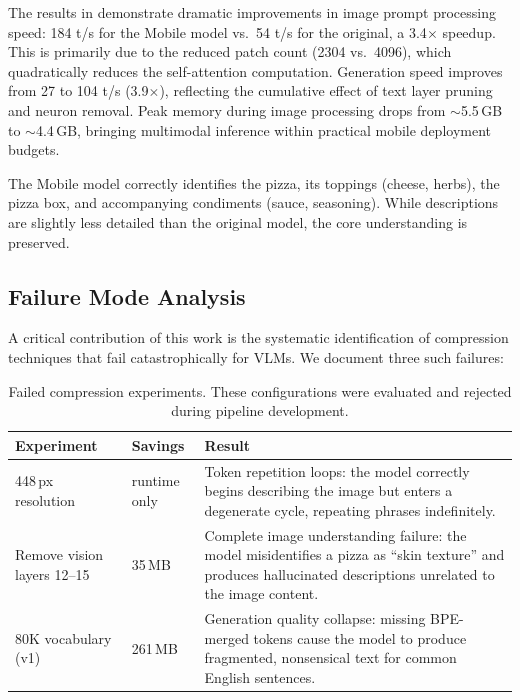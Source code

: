 \documentclass[11pt]{article}
\begin{document}
The results in  demonstrate dramatic improvements in image prompt processing speed: 184 t/s for the Mobile model vs.\ 54 t/s for the original, a 3.4$\times$ speedup. This is primarily due to the reduced patch count (2304 vs.\ 4096), which quadratically reduces the self-attention computation. Generation speed improves from 27 to 104 t/s (3.9$\times$), reflecting the cumulative effect of text layer pruning and neuron removal. Peak memory during image processing drops from $\sim$5.5\,GB to $\sim$4.4\,GB, bringing multimodal inference within practical mobile deployment budgets.

The Mobile model correctly identifies the pizza, its toppings (cheese, herbs), the pizza box, and accompanying condiments (sauce, seasoning). While descriptions are slightly less detailed than the original model, the core understanding is preserved.

\subsection{Failure Mode Analysis}
\label{sec:failure}

A critical contribution of this work is the systematic identification of compression techniques that fail catastrophically for VLMs. We document three such failures:

\begin{table}[t]
\centering
\caption{Failed compression experiments. These configurations were evaluated and rejected during pipeline development.}
\label{tab:failures}
\begin{tabular}{@{}llp{6cm}@{}}
\toprule
Experiment & Savings & Result \\
\midrule
448\,px resolution & runtime only & Token repetition loops: the model correctly begins describing the image but enters a degenerate cycle, repeating phrases indefinitely. \\
\addlinespace
Remove vision layers 12--15 & 35\,MB & Complete image understanding failure: the model misidentifies a pizza as ``skin texture'' and produces hallucinated descriptions unrelated to the image content. \\
\addlinespace
80K vocabulary (v1) & 261\,MB & Generation quality collapse: missing BPE-merged tokens cause the model to produce fragmented, nonsensical text for common English sentences. \\
\bottomrule
\end{tabular}
\end{table}
\end{document}
